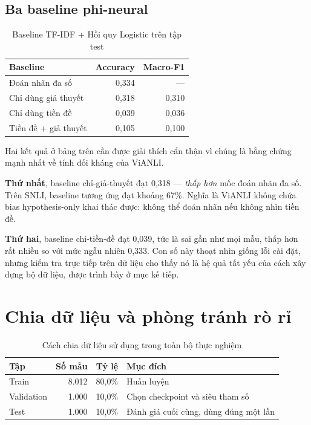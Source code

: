 \documentclass[12pt,a4paper,oneside]{report}
\begin{document}
\subsection{Ba baseline phi-neural}

\begin{table}[H]
\centering
\caption{Baseline TF-IDF + Hồi quy Logistic trên tập test}
\begin{tabular}{lrr}
\toprule
\textbf{Baseline} & \textbf{Accuracy} & \textbf{Macro-F1} \\
\midrule
Đoán nhãn đa số            & 0,334 & --- \\
Chỉ dùng giả thuyết        & 0,318 & 0,310 \\
Chỉ dùng tiền đề           & 0,039 & 0,036 \\
Tiền đề + giả thuyết       & 0,105 & 0,100 \\
\bottomrule
\end{tabular}
\end{table}

Hai kết quả ở bảng trên cần được giải thích cẩn thận vì chúng là bằng chứng mạnh nhất về
tính đối kháng của ViANLI.

\textbf{Thứ nhất}, baseline chỉ-giả-thuyết đạt 0,318 --- \textit{thấp hơn} mốc đoán nhãn
đa số. Trên SNLI, baseline tương ứng đạt khoảng 67\%. Nghĩa là ViANLI không chứa bias
hypothesis-only khai thác được: không thể đoán nhãn nếu không nhìn tiền đề.

\textbf{Thứ hai}, baseline chỉ-tiền-đề đạt 0,039, tức là sai gần như mọi mẫu, thấp hơn rất
nhiều so với mức ngẫu nhiên 0,333. Con số này thoạt nhìn giống lỗi cài đặt, nhưng kiểm tra
trực tiếp trên dữ liệu cho thấy nó là hệ quả tất yếu của cách xây dựng bộ dữ liệu, được
trình bày ở mục kế tiếp.

\section{Chia dữ liệu và phòng tránh rò rỉ}

\begin{table}[H]
\centering
\caption{Cách chia dữ liệu sử dụng trong toàn bộ thực nghiệm}
\begin{tabular}{lrrl}
\toprule
\textbf{Tập} & \textbf{Số mẫu} & \textbf{Tỷ lệ} & \textbf{Mục đích} \\
\midrule
Train      & 8.012 & 80,0\% & Huấn luyện \\
Validation & 1.000 & 10,0\% & Chọn checkpoint và siêu tham số \\
Test       & 1.000 & 10,0\% & Đánh giá cuối cùng, dùng đúng một lần \\
\bottomrule
\end{tabular}
\end{table}
\end{document}
